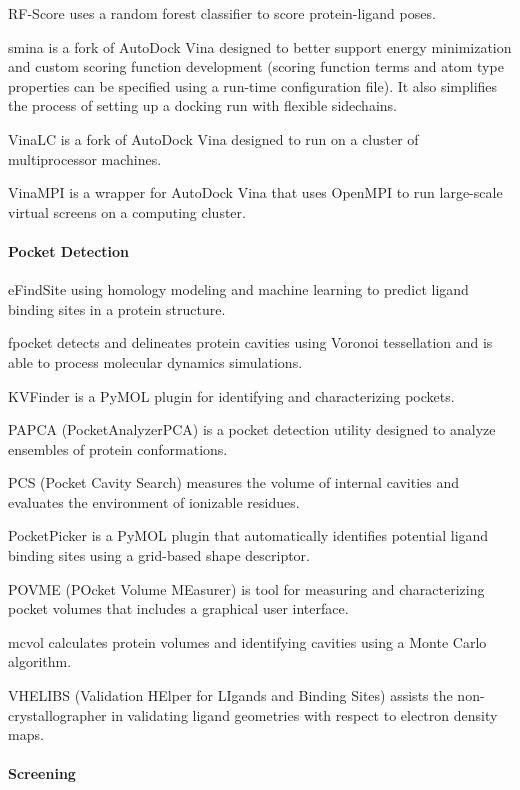 RF-Score \cite{Li_2015,Ballester_2010} uses a random forest classifier to score protein-ligand poses.

smina \cite{Koes_2013} is a fork of AutoDock Vina designed to better support energy minimization and custom scoring function development (scoring function terms and atom type properties can be specified using a run-time configuration file). It also simplifies the process of setting up a docking run with flexible sidechains.

VinaLC  \cite{Zhang_2013} is a fork of AutoDock Vina designed to run on a cluster of multiprocessor machines.

VinaMPI \cite{Ellingson_2013} is a wrapper for AutoDock Vina that uses OpenMPI to run large-scale virtual screens on a computing cluster.

\paragraph{Pocket Detection}
eFindSite \cite{Brylinski_2013} using homology modeling and machine learning to predict ligand binding sites in a protein structure.

fpocket  \cite{Schmidtke_2011} detects and delineates protein cavities using Voronoi tessellation and is able to process molecular dynamics simulations.

KVFinder \cite{Oliveira_2014} is a PyMOL plugin for identifying and characterizing pockets.

PAPCA (PocketAnalyzerPCA) is a pocket detection utility designed to analyze ensembles of protein conformations.

PCS (Pocket Cavity Search) measures the volume of internal cavities and evaluates the environment of ionizable residues.

PocketPicker \cite{Weisel_2007}  is a PyMOL plugin that automatically identifies potential ligand binding sites using a grid-based shape descriptor.

POVME (POcket Volume MEasurer) \cite{Durrant_2014} is tool for measuring and characterizing pocket volumes that includes a graphical user interface.

mcvol \cite{Till_2009} calculates protein volumes and identifying cavities using a Monte Carlo algorithm.

VHELIBS (Validation HElper for LIgands and Binding Sites) \cite{Cereto_Massagu__2013} assists the non-crystallographer in validating ligand geometries with respect to electron density maps.


\paragraph{Screening}